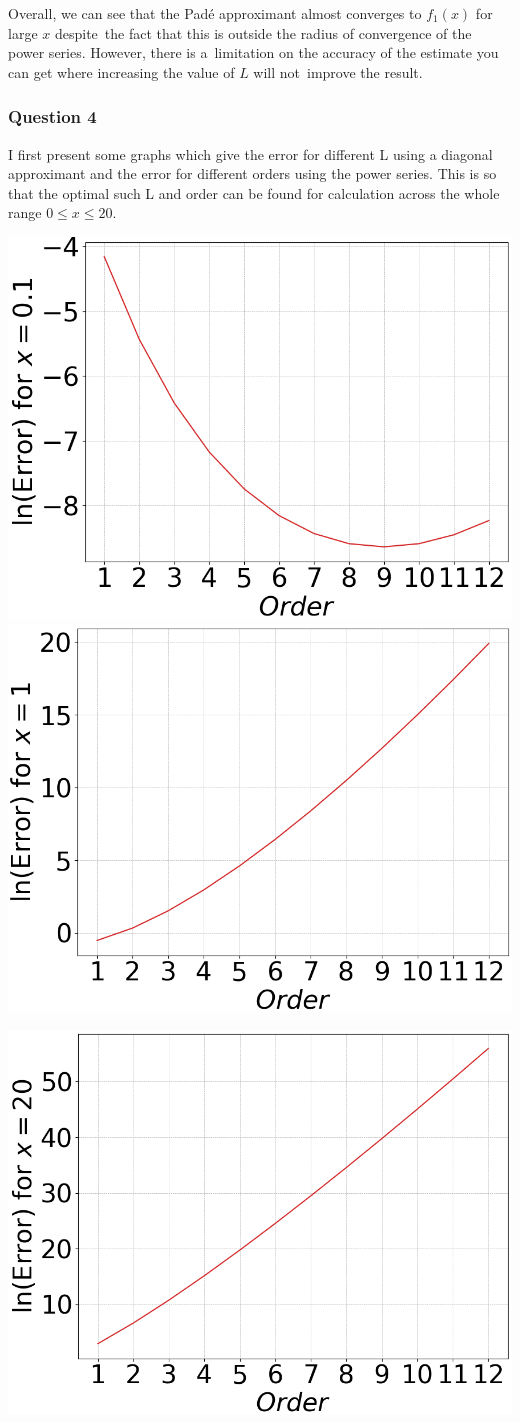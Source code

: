 \documentclass[12pt, a4paper]{article}
\begin{document}
Overall, we can see that the Pad\'e approximant almost converges to $f_{1}(x)$ for large $x$ despite\ 
the fact that this is outside the radius of convergence of the power series. However, there is a\ 
limitation on the accuracy of the estimate you can get where increasing the value of $L$ will not\ 
improve the result.


\subsubsection*{Question 4}

I first present some graphs which give the error for different L using a diagonal approximant and
the error for different orders using the power series. This is so that the optimal such L and order
can be found for calculation across the whole range $0 \leq x \leq 20$.

\begin{minipage}{\textwidth}
	\centering
	\includegraphics[width=0.49\linewidth]{q4_series_x=0.1}
	\includegraphics[width=0.49\linewidth]{q4_series_x=1}

	\vspace{0.3cm}

	\includegraphics[width=0.5\linewidth]{q4_series_x=20}

	\vspace*{-0.2cm}

	\label{q4_series_change}
\end{minipage}
\vspace{0.5cm}
\end{document}
